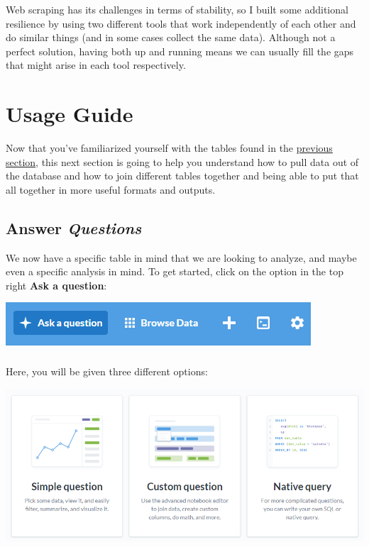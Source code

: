 \documentclass[
]{book}
\begin{document}
Web scraping has its challenges in terms of stability, so I built some additional resilience by using two different tools that work independently of each other and do similar things (and in some cases collect the same data). Although not a perfect solution, having both up and running means we can usually fill the gaps that might arise in each tool respectively.

\hypertarget{usage-guide}{%
\chapter{Usage Guide}\label{usage-guide}}

Now that you've familiarized yourself with the tables found in the \protect\hyperlink{useful-tables}{previous section}, this next section is going to help you understand how to pull data out of the database and how to join different tables together and being able to put that all together in more useful formats and outputs.

\hypertarget{answer-questions}{%
\section{\texorpdfstring{Answer \emph{Questions}}{Answer Questions}}\label{answer-questions}}

We now have a specific table in mind that we are looking to analyze, and maybe even a specific analysis in mind. To get started, click on the option in the top right \textbf{Ask a question}:

\includegraphics{images/AskAQuestion.png}

Here, you will be given three different options:

\includegraphics{images/QuestionOptions.png}
\end{document}
